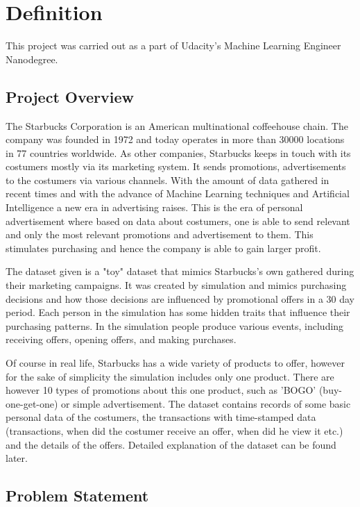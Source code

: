 \section{Definition}

This project was carried out as a part of Udacity's Machine Learning Engineer Nanodegree.

\subsection{Project Overview}

The Starbucks Corporation is an American multinational coffeehouse chain. The company was founded in 1972 and today operates in more than 30000 locations in 77 countries worldwide. As other companies, Starbucks keeps in touch with its costumers mostly via its marketing system. It sends promotions, advertisements to the costumers via various channels. With the amount of data gathered in recent times and with the advance of Machine Learning techniques and Artificial Intelligence a new era in advertising raises. This is the era of personal advertisement where based on data about costumers, one is able to send relevant and only the most relevant promotions and advertisement to them. This stimulates purchasing and hence the company is able to gain larger profit.

The dataset given is a "toy" dataset that mimics Starbucks's own gathered during their marketing campaigns. It was created by simulation and mimics purchasing decisions and how those decisions are influenced by promotional offers in a 30 day period. Each person in the simulation has some hidden traits that influence their purchasing patterns. In the simulation people produce various events, including receiving offers, opening offers, and making purchases.

Of course in real life, Starbucks has a wide variety of products to offer, however for the sake of simplicity the simulation includes only one product. There are however 10 types of promotions about this one product, such as 'BOGO' (buy-one-get-one) or simple advertisement. The dataset contains records of some basic personal data of the costumers, the transactions with time-stamped data (transactions, when did the costumer receive an offer, when did he view it etc.) and the details of the offers. Detailed explanation of the dataset can be found later.

\subsection{Problem Statement}

